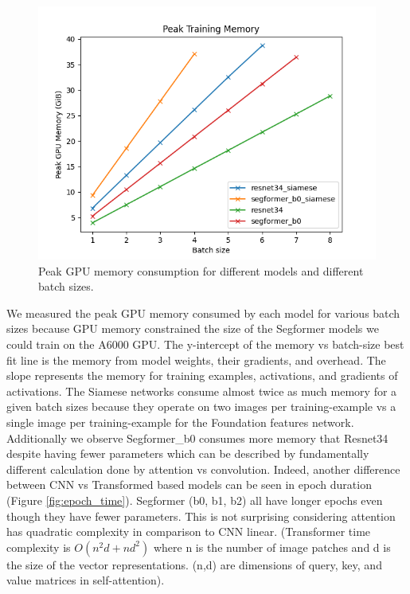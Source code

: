 \documentclass[10pt,twocolumn,letterpaper]{article}
\begin{document}
\begin{figure}[t]
  \centering
   \includegraphics[width=1.0\linewidth]{final-report/figures/peak_training_gpu_memory.png}
   \caption{Peak GPU memory consumption for different models and different batch sizes.}
   \label{fig:peak_gpu_memory}
\end{figure}

We measured the peak GPU memory consumed by each model for various batch sizes because GPU memory constrained the size of the Segformer models we could train on the A6000 GPU. The y-intercept of the memory vs batch-size best fit line is the memory from model weights, their gradients, and overhead. The slope represents the memory for training examples, activations, and gradients of activations. The Siamese networks consume almost twice as much memory for a given batch sizes because they operate on two images per training-example vs a single image per training-example for the Foundation features network. Additionally we observe Segformer\_b0 consumes more memory that Resnet34 despite having fewer parameters which can be described by fundamentally different calculation done by attention vs convolution. Indeed, another difference between CNN vs Transformed based models can be seen in epoch duration (Figure \ref{fig:epoch_time}). Segformer (b0, b1, b2) all have longer epochs even though they have fewer parameters. This is not surprising considering attention has quadratic complexity in comparison to CNN linear. (Transformer time complexity is $O(n^2d + nd^2)$ where n is the number of image patches and d is the size of the vector representations. (n,d) are dimensions of query, key, and value matrices in self-attention).
\end{document}
